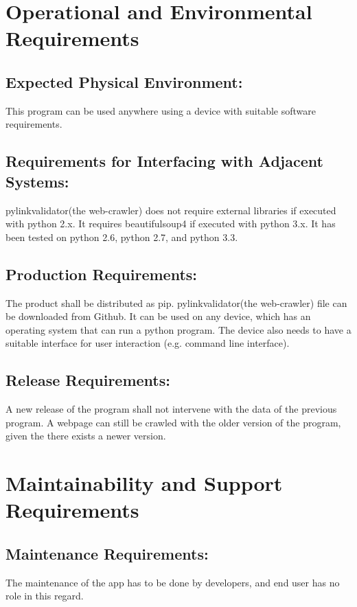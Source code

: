 \documentclass[titlepage]{article}
\begin{document}
\section{Operational and Environmental Requirements }

\subsection*{Expected Physical Environment:}
This program can be used anywhere using a device with suitable software requirements. 

\subsection*{Requirements for Interfacing with Adjacent Systems:}
pylinkvalidator(the web-crawler) does not require external libraries if executed with python 2.x. It requires beautifulsoup4 if executed with python 3.x. It has been tested on python 2.6, python 2.7, and python 3.3.


\subsection*{Production Requirements:}

The product shall be distributed as pip. pylinkvalidator(the web-crawler) file can be downloaded from Github. It can be used on any device, which has an operating system that can run a python program. The device also needs to have a suitable interface for user interaction (e.g. command line interface).


\subsection*{Release Requirements: }
A new release of the program shall not intervene with the data of the previous program. A webpage can still be crawled with the older version of the program, given the there exists a newer version.

\section{Maintainability and Support Requirements }

\subsection*{Maintenance Requirements:}
 The maintenance of the app has to be done by developers, and end user has no role in this regard.
\end{document}
